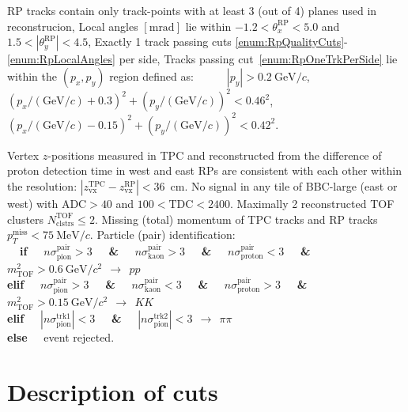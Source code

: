 \begin{enumerate}[label=\textbf{C\arabic*},ref=C\arabic*]
\begin{enumerate}[label=\textbf{\theenumi.\arabic*},ref=\theenumi.\arabic*]
      \itemm RP tracks contain only track-points with at least 3 (out of 4) planes used in reconstrucion,\label{enum:RpQualityCuts}
      \itemm Local angles $[\textrm{mrad}]$ lie within $-1.2<\theta_{x}^{\textrm{RP}}<5.0$ and $1.5<|\theta_{y}^{\textrm{RP}}|<4.5$,\label{enum:RpLocalAngles}
      \itemm Exactly 1 track passing cuts \ref{enum:RpQualityCuts}-\ref{enum:RpLocalAngles} per side,\label{enum:RpOneTrkPerSide}
      \itemm Tracks passing cut~\ref{enum:RpOneTrkPerSide} lie within the $(p_{x},p_{y})$ region defined as\label{enum:RpFiducial}:~~~~~~$|p_{y}|>0.2~\textrm{GeV}/c$,\\[4pt]
      $(p_{x}/(\textrm{GeV}/c)+0.3)^{2}+(p_{y}/(\textrm{GeV}/c))^{2}<0.46^{2}$,~~~~~~~$(p_{x}/(\textrm{GeV}/c)-0.15)^{2}+(p_{y}/(\textrm{GeV}/c))^{2}<0.42^{2}$.
    \end{enumerate}
 \itemm Vertex $z$-positions measured in TPC and reconstructed from the difference of proton detection time in west and east RPs are consistent with each other within the resolution: $|z_{\textrm{vx}}^{\textrm{TPC}}-z_{\textrm{vx}}^{\textrm{RP}}|<36$~cm.\label{enum:CutDeltaZVx}
 \itemm No signal in any tile of BBC-large (east or west) with $\textrm{ADC}>40$ and $100<\textrm{TDC}<2400$.\label{enum:CutBbcLarge}
 \itemm Maximally 2 reconstructed TOF clusters $N^{\textrm{TOF}}_{\textrm{clstrs}}\leq 2$.\label{enum:CutTofClusters}
 \itemm Missing (total) momentum of TPC tracks and RP tracks $p_{T}^{\textrm{miss}}<75~\textrm{MeV}/c$.\label{enum:CutMissingPt}
 \itemm Particle (pair) identification:\label{enum:CutPid}\\
 \textbf{~~if~~} $n\sigma_{\textrm{pion}}^{\textrm{pair}}>3$ \textbf{~~\&~~} $n\sigma_{\textrm{kaon}}^{\textrm{pair}}>3$ \textbf{~~\&~~} $n\sigma_{\textrm{proton}}^{\textrm{pair}}<3$ \textbf{~~\&~~} $m^{2}_{\textrm{TOF}}>0.6~\textrm{GeV}/c^{2}~~\rightarrow~~pp$\\%
\textbf{elif~~} $n\sigma_{\textrm{pion}}^{\textrm{pair}}>3$ \textbf{~~\&~~} $n\sigma_{\textrm{kaon}}^{\textrm{pair}}<3$ \textbf{~~\&~~} $n\sigma_{\textrm{proton}}^{\textrm{pair}}>3$ \textbf{~~\&~~} $m^{2}_{\textrm{TOF}}>0.15~\textrm{GeV}/c^{2}~~\rightarrow~~KK$\\%
\textbf{elif~~} $|n\sigma_{\textrm{pion}}^{\textrm{trk1}}|<3$ \textbf{~~\&~~} $|n\sigma_{\textrm{pion}}^{\textrm{trk2}}|<3~~\rightarrow~~\pi\pi$\\%
\textbf{else~~} event rejected.
\end{enumerate}

\section{Description of cuts}\label{sec:descriptionOfCuts}
